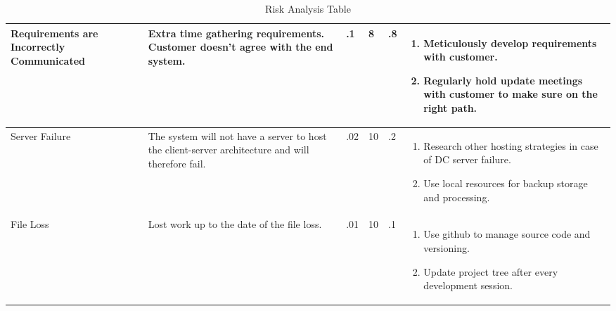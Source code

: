 \begin{table}
\begin{tabular}{|p{7em}|p{7em}|p{5em}|p{4em}|p{4em}|p{11em}|}
\hline
Requirements are Incorrectly Communicated & Extra time gathering requirements. Customer doesn't agree with the end system. & .1 & 8 & .8 & 
 \begin{enumerate}
	\item Meticulously develop requirements with customer.
	\item Regularly hold update meetings with customer to make sure on the right path.
\end{enumerate}\\
\hline
Server Failure & The system will not have a server to host the client-server architecture and will therefore fail. & .02 & 10 & .2 & 
 \begin{enumerate}
	\item Research other hosting strategies in case of DC server failure.
	\item Use local resources for backup storage and processing.
\end{enumerate} \\
\hline
File Loss & Lost work up to the date of the file loss. & .01 & 10 & .1 & 
 \begin{enumerate}
	\item Use github to manage source code and versioning.
	\item Update project tree after every development session.
\end{enumerate} \\
\hline
\end{tabular}
\caption{Risk Analysis Table}
\label{tab:riskAnalysis}
\end{table}